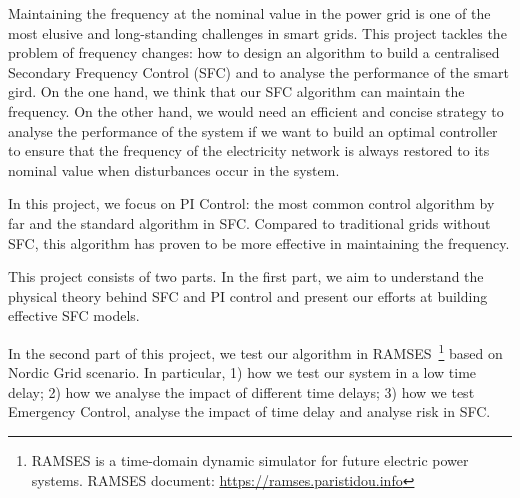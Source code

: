 
Maintaining the frequency at the nominal value in the power grid is one of the most elusive and long-standing challenges in smart grids. This project tackles the problem of frequency changes: how to design an algorithm to build a centralised Secondary Frequency Control (SFC) and to analyse the performance of the smart gird. On the one hand, we think that our SFC algorithm can maintain the frequency. On the other hand, we would need an efficient and concise strategy to analyse the performance of the system if we want to build an optimal controller to ensure that the frequency of the electricity network is always restored to its nominal value when disturbances occur in the system. 

In this project, we focus on PI Control: the most common control algorithm by far and the standard algorithm in SFC. Compared to traditional grids without SFC, this algorithm has proven to be more effective in maintaining the frequency. 

This project consists of two parts. In the first part, we aim to understand the physical theory behind SFC and PI control and present our efforts at building effective SFC models. 

In the second part of this project, we test our algorithm in RAMSES~\footnote{RAMSES is a time-domain dynamic simulator for future electric power systems. RAMSES document: \href{https://ramses.paristidou.info}{https://ramses.paristidou.info}} based on Nordic Grid scenario. In particular, 1) how we test our system in a low time delay; 2) how we analyse the impact of different time delays; 3) how we test Emergency Control, analyse the impact of time delay and analyse risk in SFC. 